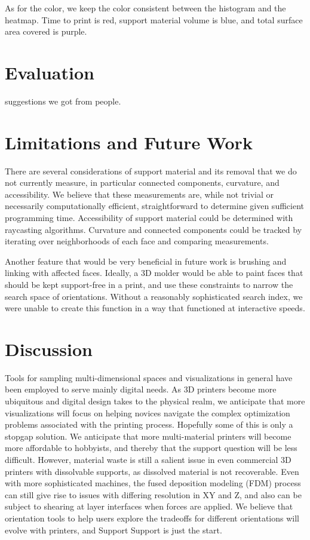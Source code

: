 \documentclass{sigchi}
\begin{document}
As for the color, we keep the color consistent between the histogram and the heatmap. Time to print is red, support material volume is blue, and total surface area covered is purple.

\section{Evaluation}
suggestions we got from people.

\section{Limitations and Future Work}
There are several considerations of support material and its removal that we do not currently measure, in particular connected components, curvature, and accessibility.  We believe that these measurements are, while not trivial or necessarily computationally efficient, straightforward to determine given sufficient programming time.  Accessibility of support material could be determined with raycasting algorithms.  Curvature and connected components could be tracked by iterating over neighborhoods of each face and comparing measurements.

Another feature that would be very beneficial in future work is brushing and linking with affected faces.  Ideally, a 3D molder would be able to paint faces that should be kept support-free in a print, and use these constraints to narrow the search space of orientations.  Without a reasonably sophisticated search index, we were unable to create this function in a way that functioned at interactive speeds.

\section{Discussion}
Tools for sampling multi-dimensional spaces and visualizations in general have been employed to serve mainly digital needs.  As 3D printers become more ubiquitous and digital design takes to the physical realm, we anticipate that more visualizations will focus on helping novices navigate the complex optimization problems associated with the printing process.  Hopefully some of this is only a stopgap solution.  We anticipate that more multi-material printers will become more affordable to hobbyists, and thereby that the support question will be less difficult.  However, material waste is still a salient issue in even commercial 3D printers with dissolvable supports, as dissolved material is not recoverable.  Even with more sophisticated machines, the fused deposition modeling (FDM) process can still give rise to issues with differing resolution in XY and Z, and also can be subject to shearing at layer interfaces when forces are applied.  We believe that orientation tools to help users explore the tradeoffs for different orientations will evolve with printers, and Support Support is just the start.
\end{document}
